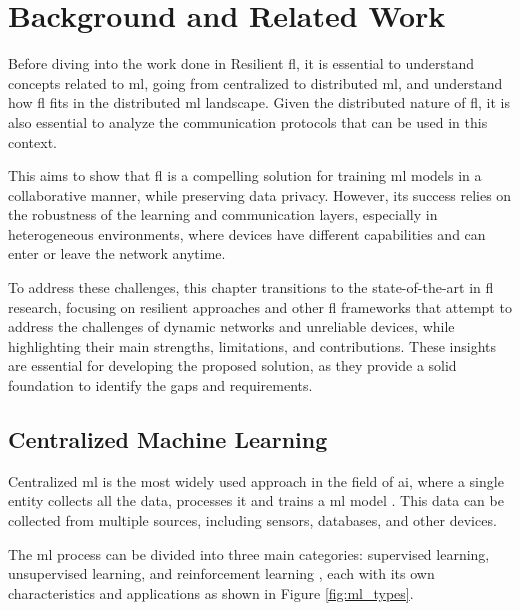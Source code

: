 \chapter{Background and Related Work}
\label{chap:background}

\begin{introduction}

Before diving into the work done in Resilient \ac{fl}, it is essential to understand concepts related to \ac{ml}, going from centralized to distributed \ac{ml}, and understand how \ac{fl} fits in the distributed \ac{ml} landscape. Given the distributed nature of \ac{fl}, it is also essential to analyze the communication protocols that can be used in this context. 

This aims to show that \ac{fl} is a compelling solution for training \ac{ml} models in a collaborative manner, while preserving data privacy. However, its success relies on the robustness of the learning and communication layers, especially in heterogeneous environments, where devices have different capabilities and can enter or leave the network anytime.

To address these challenges, this chapter transitions to the state-of-the-art in \ac{fl} research, focusing on resilient approaches and other \ac{fl} frameworks that attempt to address the challenges of dynamic networks and unreliable devices, while highlighting their main strengths, limitations, and contributions. These insights are essential for developing the proposed solution, as they provide a solid foundation to identify the gaps and requirements.

\end{introduction}


\section{Centralized Machine Learning}
\label{sec:centralized-ml}

Centralized \ac{ml} is the most widely used approach in the field of \ac{ai}, where a single entity collects all the data, processes it and trains a \ac{ml} model \cite{abdulrahman2020survey}. This data can be collected from multiple sources, including sensors, databases, and other devices. 

The \ac{ml} process can be divided into three main categories: supervised learning, unsupervised learning, and reinforcement learning \cite{sahoo2024evolution}, each with its own characteristics and applications as shown in Figure \ref{fig:ml_types}.

